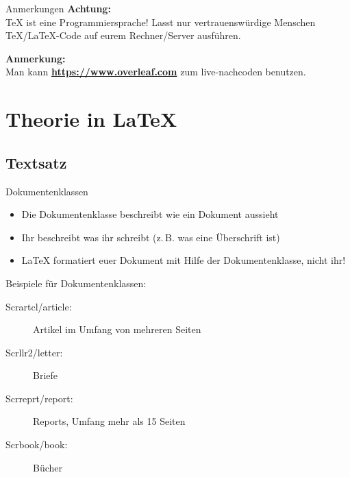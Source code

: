 \documentclass{beamer}
\newcommand{\slideheading}[1]{\textbf{#1}\\}
\begin{document}
		
		\begin{frame}{Anmerkungen}
			\slideheading{Achtung:} \TeX{} ist eine Programmiersprache! Lasst nur vertrauenswürdige
			Menschen \TeX/\LaTeX-Code auf eurem Rechner/Server ausführen.
			
			\vspace{0.2cm}
			\slideheading{Anmerkung:} Man kann \textbf{\href{https://www.overleaf.com}{https://www.overleaf.com}} zum live-nachcoden benutzen.
		\end{frame}
		
		
		\section{Theorie in \LaTeX{}}
		\subsection{Textsatz}
		
		\begin{frame}{Dokumentenklassen}
			\begin{itemize}
				\item Die Dokumentenklasse beschreibt wie ein Dokument aussieht
				\item Ihr beschreibt was ihr schreibt (z.\,B. was eine Überschrift ist)
				\item \LaTeX{} formatiert euer Dokument mit Hilfe der Dokumentenklasse, nicht ihr!
			\end{itemize}
			\vspace{0.2cm}
			Beispiele für Dokumentenklassen:
			\begin{description}
				\item[Scrartcl/article:] Artikel im Umfang von mehreren Seiten
				\item[Scrllr2/letter:] Briefe
				\item[Scrreprt/report:] Reports, Umfang mehr als 15 Seiten
				\item[Scrbook/book:] Bücher
			\end{description}
		\end{frame}
		
		
\end{document}

